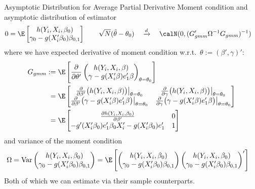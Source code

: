 \documentclass[aspectratio=169, handout]{beamer}
\newcommand{\Var}{\operatorname{Var}}
\newcommand{\dto}{\xrightarrow{d}}
\begin{document}
{\scriptsize
\begin{frame}{Asymptotic Distribution for Average Partial Derivative}
Moment condition and asymptotic distribution of estimator
\begin{align*}
  0
  &=
  \E
  \begin{bmatrix}
    h(Y_i,X_i,\beta_0)
    \\
    \gamma_0-g(X_i'\beta_0)\beta_{0,1}
  \end{bmatrix}
  \qquad
  \sqrt{N}(\hat{\theta}-\theta_0)
  \quad\dto\quad
  \calN(0,(G_{gmm}'\Omega^{-1}G_{gmm})^{-1})
\end{align*}
where we have expected derivative of moment condition w.r.t.\
$\theta:=(\beta',\gamma)'$:
\begin{align*}
  G_{gmm}
  &
  :=
  \E\left[
    \frac{\partial}{\partial \theta'}
    \begin{pmatrix}
      h(Y_i,X_i,\beta)
      \\
      \gamma-g(X_i'\beta)e_1'\beta
    \end{pmatrix}_{\theta=\theta_0}
  \right]
  \\
  &\hphantom{:}=
  \E
  \begin{bmatrix}
    \frac{\partial }{\partial \beta'}
    \big(h(Y_i,X_i,\beta)\big)\big|_{\theta=\theta_0}
    &
    \frac{\partial}{\partial \gamma}
    \big( h(Y_i,X_i,\beta)\big)\big|_{\theta=\theta_0}
    \\
    \frac{\partial}{\partial \beta'}
    \big(
    \gamma-g(X_i'\beta)e_1'\beta
    \big)
    \big|_{\theta=\theta_0}
    &
    \frac{\partial}{\partial \gamma}
    \big(
    \gamma-g(X_i'\beta)e_1'\beta
    \big)
    \big|_{\theta=\theta_0}
  \end{bmatrix}
  \\
  &\hphantom{:}=
  \E
  \begin{bmatrix}
    \frac{\partial h(Y_i,X_i,\beta_0)}{\partial \beta'}
    &
    0
    \\
    -g'(X_i'\beta_0)e_1'\beta_{0}X_i'
    -g(X_i'\beta_0)e_1'
    &
    1
  \end{bmatrix}
\end{align*}
and variance of the moment condition
\begin{align*}
  \Omega
  &=
  \Var
  \begin{pmatrix}
    h(Y_i,X_i,\beta_0)
    \\
    \gamma_0-g(X_i'\beta_0)\beta_{0,1}
  \end{pmatrix}
  =
  \E
  \left[
  \begin{pmatrix}
    h(Y_i,X_i,\beta_0)
    \\
    \gamma_0-g(X_i'\beta_0)\beta_{0,1}
  \end{pmatrix}
  \begin{pmatrix}
    h(Y_i,X_i,\beta_0)
    \\
    \gamma_0-g(X_i'\beta_0)\beta_{0,1}
  \end{pmatrix}'
  \right]
\end{align*}
Both of which we can estimate via their sample counterparts.
\end{frame}
}
\end{document}
